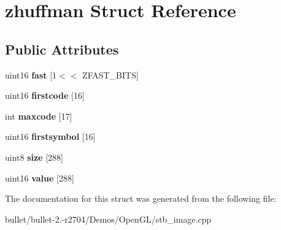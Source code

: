 \hypertarget{structzhuffman}{\section{zhuffman Struct Reference}
\label{structzhuffman}
}
\subsection*{Public Attributes}
\begin{DoxyCompactItemize}
\item 
\hypertarget{structzhuffman_a12d5f92a121b65680e5f0b4027d00c96}{uint16 {\bfseries fast} \mbox{[}1$<$$<$ Z\+F\+A\+S\+T\+\_\+\+B\+I\+T\+S\mbox{]}}\label{structzhuffman_a12d5f92a121b65680e5f0b4027d00c96}

\item 
\hypertarget{structzhuffman_a81f5ae5bd31b40439955de6154572917}{uint16 {\bfseries firstcode} \mbox{[}16\mbox{]}}\label{structzhuffman_a81f5ae5bd31b40439955de6154572917}

\item 
\hypertarget{structzhuffman_ac7dd4a2bf01a6e27933dd1cf6b0cc762}{int {\bfseries maxcode} \mbox{[}17\mbox{]}}\label{structzhuffman_ac7dd4a2bf01a6e27933dd1cf6b0cc762}

\item 
\hypertarget{structzhuffman_afbdb21fd99f413fc8f9e58243552fe95}{uint16 {\bfseries firstsymbol} \mbox{[}16\mbox{]}}\label{structzhuffman_afbdb21fd99f413fc8f9e58243552fe95}

\item 
\hypertarget{structzhuffman_a46ce4d4a4d7fc41c2560616f6696e9b9}{uint8 {\bfseries size} \mbox{[}288\mbox{]}}\label{structzhuffman_a46ce4d4a4d7fc41c2560616f6696e9b9}

\item 
\hypertarget{structzhuffman_acc395b638b700b944c329d71a8b82084}{uint16 {\bfseries value} \mbox{[}288\mbox{]}}\label{structzhuffman_acc395b638b700b944c329d71a8b82084}

\end{DoxyCompactItemize}


The documentation for this struct was generated from the following file\+:\begin{DoxyCompactItemize}
\item 
bullet/bullet-\/2.-\/r2704/\+Demos/\+Open\+G\+L/stb\+\_\+image.\+cpp\end{DoxyCompactItemize}
